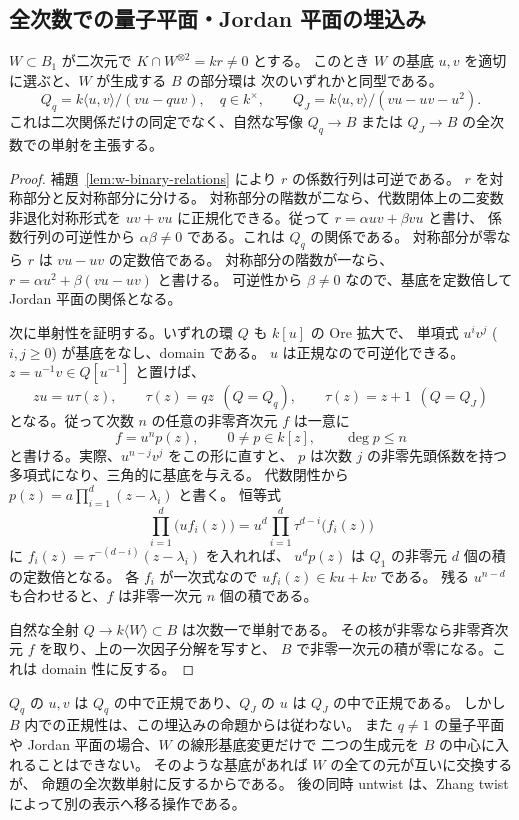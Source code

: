 \subsection{全次数での量子平面・Jordan 平面の埋込み}

\begin{proposition}
\label{prop:w-embedded-plane}
$W\subset B_1$ が二次元で $K\cap W^{\otimes2}=kr\ne0$ とする。
このとき $W$ の基底 $u,v$ を適切に選ぶと、$W$ が生成する $B$ の部分環は
次のいずれかと同型である。
\[
 Q_q=k\langle u,v\rangle/(vu-quv),\quad q\in k^\times,
 \qquad
 Q_J=k\langle u,v\rangle/(vu-uv-u^2).
\]
これは二次関係だけの同定でなく、自然な写像 $Q_q\to B$ または $Q_J\to B$
の全次数での単射を主張する。
\end{proposition}
\begin{proof}
補題~\ref{lem:w-binary-relations} により $r$ の係数行列は可逆である。
$r$ を対称部分と反対称部分に分ける。
対称部分の階数が二なら、代数閉体上の二変数非退化対称形式を
$uv+vu$ に正規化できる。従って $r=\alpha uv+\beta vu$ と書け、
係数行列の可逆性から $\alpha\beta\ne0$ である。これは $Q_q$ の関係である。
対称部分が零なら $r$ は $vu-uv$ の定数倍である。
対称部分の階数が一なら、$r=\alpha u^2+\beta(vu-uv)$ と書ける。
可逆性から $\beta\ne0$ なので、基底を定数倍して Jordan 平面の関係となる。

次に単射性を証明する。いずれの環 $Q$ も $k[u]$ の Ore 拡大で、
単項式 $u^iv^j$ ($i,j\ge0$) が基底をなし、domain である。
$u$ は正規なので可逆化できる。
$z=u^{-1}v\in Q[u^{-1}]$ と置けば、
\[
 zu=u\tau(z),\qquad
 \tau(z)=qz\ \ (Q=Q_q),\qquad
 \tau(z)=z+1\ \ (Q=Q_J)
\]
となる。従って次数 $n$ の任意の非零斉次元 $f$ は一意に
\[
 f=u^n p(z),\qquad 0\ne p\in k[z],\qquad \deg p\le n
\]
と書ける。実際、$u^{n-j}v^j$ をこの形に直すと、
$p$ は次数 $j$ の非零先頭係数を持つ多項式になり、三角的に基底を与える。
代数閉性から $p(z)=a\prod_{i=1}^d(z-\lambda_i)$ と書く。
恒等式
\[
 \prod_{i=1}^{d}\bigl(u f_i(z)\bigr)
 =u^d\prod_{i=1}^{d}\tau^{d-i}\bigl(f_i(z)\bigr)
\]
に $f_i(z)=\tau^{-(d-i)}(z-\lambda_i)$ を入れれば、
$u^dp(z)$ は $Q_1$ の非零元 $d$ 個の積の定数倍となる。
各 $f_i$ が一次式なので $u f_i(z)\in ku+kv$ である。
残る $u^{n-d}$ も合わせると、$f$ は非零一次元 $n$ 個の積である。

自然な全射 $Q\to k\langle W\rangle\subset B$ は次数一で単射である。
その核が非零なら非零斉次元 $f$ を取り、上の一次因子分解を写すと、
$B$ で非零一次元の積が零になる。これは domain 性に反する。
\end{proof}

\begin{remark}[線形基底変更による中央化の限界]
$Q_q$ の $u,v$ は $Q_q$ の中で正規であり、$Q_J$ の $u$ は $Q_J$ の中で正規である。
しかし $B$ 内での正規性は、この埋込みの命題からは従わない。
また $q\ne1$ の量子平面や Jordan 平面の場合、$W$ の線形基底変更だけで
二つの生成元を $B$ の中心に入れることはできない。
そのような基底があれば $W$ の全ての元が互いに交換するが、
命題の全次数単射に反するからである。
後の同時 untwist は、Zhang twist によって別の表示へ移る操作である。
\end{remark}


